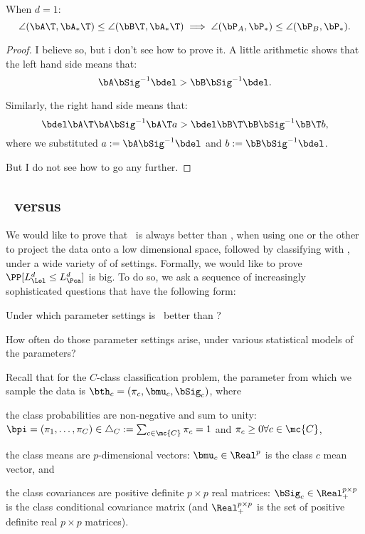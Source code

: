 \documentclass[10pt]{article}
\begin{document}
\begin{conj} \label{q:angle}
When $d=1$:
\label{q:a1}
$$\angle(\bA\T,\bA_*\T) \leq \angle(\bB\T,\bA_*\T) \implies \angle(\bP_A,\bP_*) \leq \angle(\bP_B,\bP_*).$$
\end{conj}

\begin{proof}
I believe so, but i don't see how to prove it. A little arithmetic shows that the left hand side means that:
$$\bA \bSig^{-1} \bdel > \bB \bSig^{-1} \bdel.$$

Similarly, the right hand side means that:
$$\bdel \bA\T \bA \bSig^{-1} \bA\T a > \bdel \bB\T \bB \bSig^{-1} \bB\T b,$$
where we substituted $a:=\bA\bSig^{-1} \bdel$ and $b:=\bB \bSig^{-1} \bdel$.

But I do not see how to go any further.
\end{proof}



\newpage
\subsection{\Pca~versus \Lol} \label{sec:pvl}


We would like to prove that \Lol~is always better than \Pca, when using one or the other to project the data onto a low dimensional space, followed by classifying with \Lda, under a wide variety of of settings.  Formally, we would like to prove $\PP[L_{\Lol}^d \leq L_{\Pca}^d]$ is big.  To do so, we ask a sequence of increasingly sophisticated questions that have the following form:
\begin{compactenum}
\item Under which parameter settings is \Lol~better than \Pca?
\item How often do those parameter settings arise, under various statistical models of the parameters?
\end{compactenum}


Recall that for the $C$-class classification problem, the parameter from which we sample the data is $\bth_c=(\pi_c,\bmu_c,\bSig_c)$, where 

\begin{compactitem}
\item the class probabilities are non-negative and sum to unity: $\bpi=(\pi_1,\ldots,\pi_C) \in \triangle_C := \sum_{c \in \mc{C}} \pi_c = 1$ and $\pi_c \geq 0 \forall c \in \mc{C}$,    
\item the class means are $p$-dimensional vectors: $\bmu_c \in \Real^{p}$ is the class $c$ mean vector, and 
\item the class covariances are positive definite $p \times p$ real matrices: $\bSig_c  \in \Real^{p \times p}_+$ is the class conditional covariance matrix (and $\Real^{p \times p}_+$ is the set of positive definite real $p\times p$ matrices).  
\end{compactitem}
\end{document}
